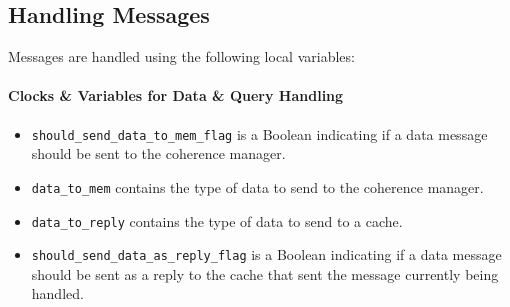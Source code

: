 \subsection{Handling Messages}
Messages are handled using the following local variables:
\paragraph{Clocks \& Variables for Data \& Query Handling}
\begin{itemize}
\item
   \lstinline!should_send_data_to_mem_flag! is a Boolean indicating if a data
   message should be sent to the coherence manager.
\item
   \lstinline!data_to_mem! contains the type of data to send to the coherence
   manager.
\item \lstinline!data_to_reply! contains the type of data to send to a cache.
\item
   \lstinline!should_send_data_as_reply_flag! is a Boolean indicating if a data
   message should be sent as a reply to the cache that sent the message
   currently being handled.
\end{itemize}

